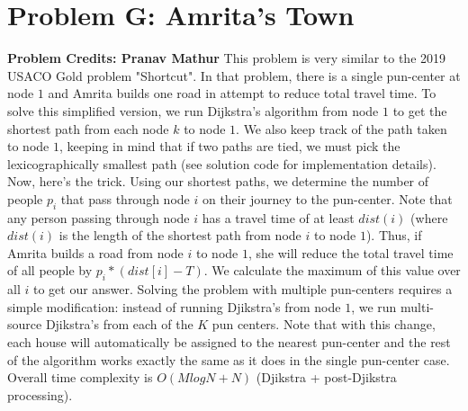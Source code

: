 \documentclass{article}
\begin{document}
\section{Problem G: Amrita's Town}
\textbf{Problem Credits: Pranav Mathur}\newline
This problem is very similar to the 2019 USACO Gold problem "Shortcut". In that problem, there is a single pun-center at node $1$ and Amrita builds one road in attempt to reduce total travel time. To solve this simplified version, we run Dijkstra's algorithm from node $1$ to get the shortest path from each node $k$ to node $1$. We also keep track of the path taken to node $1$, keeping in mind that if two paths are tied, we must pick the lexicographically smallest path (see solution code for implementation details). Now, here's the trick. Using our shortest paths, we determine the number of people $p_i$ that pass through node $i$ on their journey to the pun-center. Note that any person passing through node $i$ has a travel time of at least $dist(i)$ (where $dist(i)$ is the length of the shortest path from node $i$ to node $1$). Thus, if Amrita builds a road from node $i$ to node $1$, she will reduce the total travel time of all people by $p_i * (dist[i] - T)$. We calculate the maximum of this value over all $i$ to get our answer.\newline\newline
Solving the problem with multiple pun-centers requires a simple modification: instead of running Djikstra's from node $1$, we run multi-source Djikstra's from each of the $K$ pun centers. Note that with this change, each house will automatically be assigned to the nearest pun-center and the rest of the algorithm works exactly the same as it does in the single pun-center case. Overall time complexity is $O(MlogN + N)$ (Djikstra + post-Djikstra processing).
\end{document}
